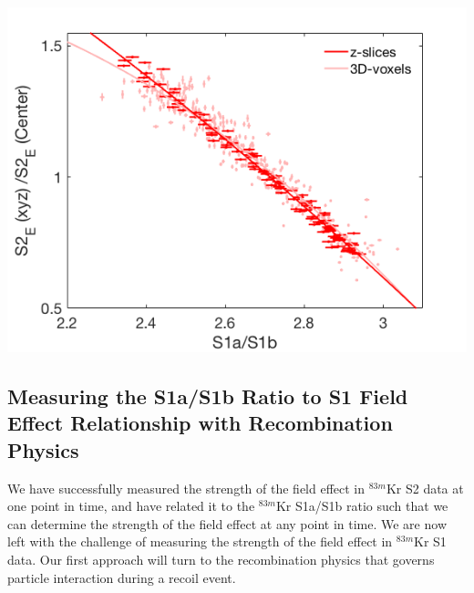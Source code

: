 \begin{center}
\includegraphics[scale=0.4]{figures/Fig4.png}
 \label{fig:S1aS1bField_S2}
\end{center}

\subsection{Measuring the S1a/S1b Ratio to S1 Field Effect Relationship with Recombination Physics} \label{section:S1relation}

We have successfully measured the strength of the field effect in $^{83m}$Kr S2 data at one point in time, and have related it to the $^{83m}$Kr S1a/S1b ratio such that we can determine the strength of the field effect at any point in time.  We are now left with the challenge of measuring the strength of the field effect in $^{83m}$Kr S1 data. Our first approach will turn to the recombination physics that governs particle interaction during a recoil event.  


